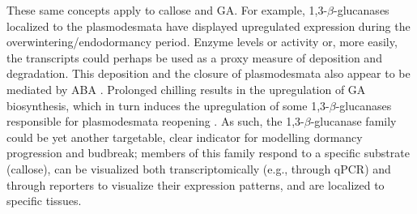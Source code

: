 \documentclass[11pt]{article}
\begin{document}
These same concepts apply to callose and GA. For example, 1,3-$\beta$-glucanases localized to the plasmodesmata have displayed upregulated expression during the overwintering/endodormancy period. Enzyme levels or activity or, more easily, the transcripts could perhaps be used as a proxy measure of deposition and degradation. This deposition and the closure of plasmodesmata also appear to be mediated by ABA \citep{tylewicz2018photoperiodic}. Prolonged chilling results in the upregulation of GA biosynthesis, which in turn induces the upregulation of some 1,3-$\beta$-glucanases responsible for plasmodesmata reopening \citep{rinne2011,singh2018genetic}. As such, the 1,3-$\beta$-glucanase family could be yet another targetable, clear indicator for modelling dormancy progression and budbreak; members of this family respond to a specific substrate (callose), can be visualized both transcriptomically (e.g., through qPCR) and through reporters to visualize their expression patterns, and are localized to specific tissues. 
 

\end{document}
